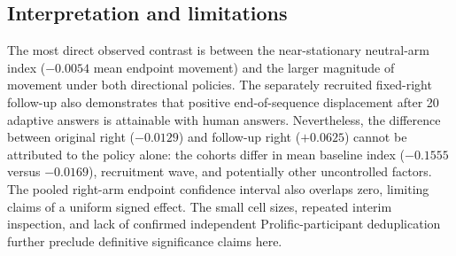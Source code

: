 
\subsection{Interpretation and limitations}
The most direct observed contrast is between the near-stationary neutral-arm
index ($-0.0054$ mean endpoint movement) and the larger magnitude of
movement under both directional policies. The separately recruited
fixed-right follow-up also demonstrates that positive
end-of-sequence displacement after 20 adaptive answers is attainable with human answers. Nevertheless,
the difference between original right ($-0.0129$) and follow-up right
($+0.0625$) cannot be attributed to the policy alone: the cohorts differ in
mean baseline index ($-0.1555$ versus $-0.0169$), recruitment wave, and
potentially other uncontrolled factors. The pooled right-arm endpoint
confidence interval also overlaps zero, limiting claims of a uniform
signed effect. The small cell sizes, repeated interim inspection, and
lack of confirmed independent Prolific-participant deduplication further
preclude definitive significance claims here.

